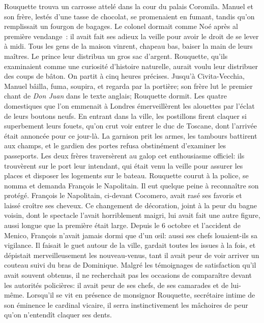 
Rouquette trouva un carrosse attelé dans la cour du palais Coromila. Manuel et son frère, lestés d'une tasse de chocolat, se promenaient en fumant, tandis qu'on remplissait un fourgon de bagages. Le colonel dormait comme Noé après al première vendange~: il avait fait ses adieux la veille pour avoir le droit de se lever à midi. Tous les gens de la maison vinrent, chapeau bas, baiser la main de leurs maîtres. Le prince leur distribua un gros sac d'argent. Rouquette, qu'ils examinaient comme une curiosité d'histoire naturelle, aurait voulu leur distribuer des coups de bâton. On partit à cinq heures précises. Jusqu'à Civita-Vecchia, Manuel bâilla, fuma, soupira, et regarda par la portière; son frère lut le premier chant de \emph{Don Juan} dans le texte anglais; Rouquette dormit. Les quatre domestiques que l'on emmenait à Londres émerveillèrent les alouettes par l'éclat de leurs boutons neufs. En entrant dans la ville, les postillons firent claquer si superbement leurs fouets, qu'on crut voir entrer le duc de Toscane, dont l'arrivée était annoncée pour ce jour-là. La garnison prit les armes, les tambours battirent aux champs, et le gardien des portes refusa obstinément d'examiner les passeports. Les deux frères traversèrent au galop cet enthousiasme officiel: ils trouvèrent sur le port leur intendant, qui était venu la veille pour assurer les places et disposer les logements sur le bateau. Rouquette courut à la police, se nomma et demanda François le Napolitain. Il eut quelque peine à reconnaître son protégé. François le Napolitain, ci-devant Cocomero, avait rasé ses favoris et laissé croître ses cheveux. Ce changement de décoration, joint à la peur du bagne voisin, dont le spectacle l'avait horriblement maigri, lui avait fait une autre figure, aussi longue que la première était large. Depuis le 6 octobre et l'accident de Menico, François n'avait jamais dormi que d'un \oe{}il: aussi ses chefs louaient-ils sa vigilance. Il faisait le guet autour de la ville, gardait toutes les issues à la fois, et dépistait merveilleusement les nouveau-venus, tant il avait peur de voir arriver un couteau suivi du bras de Dominique. Malgré les témoignages de satisfaction qu'il avait souvent obtenus, il ne recherchait pas les occasions de comparaître devant les autorités policières: il avait peur de ses chefs, de ses camarades et de lui-même. Lorsqu'il se vit en présence de monsignor Rouquette, secrétaire intime de son éminence le cardinal vicaire, il serra instinctivement les mâchoires de peur qu'on n'entendît claquer ses dents.


